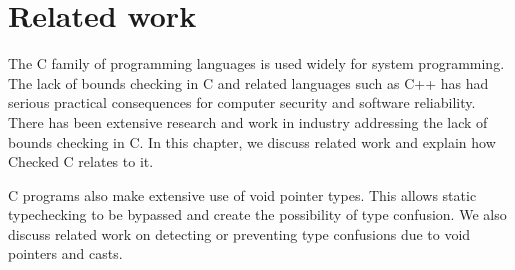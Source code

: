 
\chapter{Related work}
\label{chapter:related-work}

The C family of programming languages is used widely for system
programming.  The lack of
bounds checking in C and related languages such as C++ has had
serious practical consequences for computer security and software 
reliability.   There has been extensive research and work in industry 
addressing the lack of bounds checking in C. 
In this chapter, we discuss related work and explain how
Checked C relates to it. 

C programs also make extensive use of void pointer types. This allows
static typechecking to be bypassed and create the possibility of
type confusion.  We also discuss related work on detecting or
preventing type confusions due to void pointers and casts.

